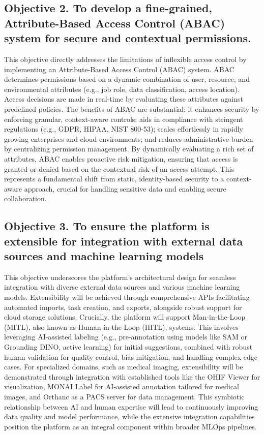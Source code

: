 \subsection*{Objective 2. To develop a fine-grained, Attribute-Based Access Control (ABAC) system for secure and contextual permissions.}
This objective directly addresses the limitations of inflexible access control by implementing an Attribute-Based Access Control (ABAC) system. ABAC determines permissions based on a dynamic combination of user, resource, and environmental attributes (e.g., job role, data classification, access location). Access decisions are made in real-time by evaluating these attributes against predefined policies. The benefits of ABAC are substantial: it enhances security by enforcing granular, context-aware controls; aids in compliance with stringent regulations (e.g., GDPR, HIPAA, NIST 800-53); scales effortlessly in rapidly growing enterprises and cloud environments; and reduces administrative burden by centralizing permission management. By dynamically evaluating a rich set of attributes, ABAC enables proactive risk mitigation, ensuring that access is granted or denied based on the contextual risk of an access attempt. This represents a fundamental shift from static, identity-based security to a context-aware approach, crucial for handling sensitive data and enabling secure collaboration.

\subsection*{Objective 3. To ensure the platform is extensible for integration with external data sources and machine learning models}
This objective underscores the platform's architectural design for seamless integration with diverse external data sources and various machine learning models. Extensibility will be achieved through comprehensive APIs facilitating automated imports, task creation, and exports, alongside robust support for cloud storage solutions. Crucially, the platform will support Man-in-the-Loop (MITL), also known as Human-in-the-Loop (HITL), systems. This involves leveraging AI-assisted labeling (e.g., pre-annotation using models like SAM or Grounding DINO, active learning) for initial suggestions, combined with robust human validation for quality control, bias mitigation, and handling complex edge cases. For specialized domains, such as medical imaging, extensibility will be demonstrated through integration with established tools like the OHIF Viewer for visualization, MONAI Label for AI-assisted annotation tailored for medical images, and Orthanc as a PACS server for data management. This symbiotic relationship between AI and human expertise will lead to continuously improving data quality and model performance, while the extensive integration capabilities position the platform as an integral component within broader MLOps pipelines.

